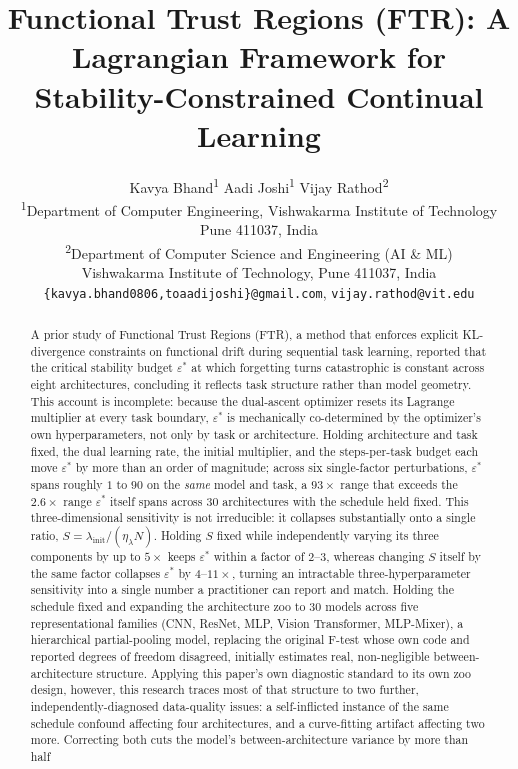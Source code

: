 \documentclass[11pt]{article}
\title{Functional Trust Regions (FTR): A Lagrangian Framework for\\
Stability-Constrained Continual Learning}
\author{
Kavya Bhand\textsuperscript{1} \quad Aadi Joshi\textsuperscript{1} \quad Vijay Rathod\textsuperscript{2} \\[4pt]
\small \textsuperscript{1}Department of Computer Engineering, Vishwakarma Institute of Technology \\
\small Pune 411037, India \\[2pt]
\small \textsuperscript{2}Department of Computer Science and Engineering (AI \& ML) \\
\small Vishwakarma Institute of Technology, Pune 411037, India \\[4pt]
\small \texttt{\{kavya.bhand0806,toaadijoshi\}@gmail.com}, \texttt{vijay.rathod@vit.edu}
}
\date{}
\newcommand{\eps}{\varepsilon}
\newcommand{\epsstar}{\eps^{*}}
\begin{document}
\maketitle
\let\svthefootnote\thefootnote
\let\thefootnote\relax{}
\let\thefootnote\svthefootnote

\begin{abstract}
A prior study of Functional Trust Regions (FTR), a method that enforces
explicit KL-divergence constraints on functional drift during sequential
task learning, reported that the critical stability budget $\epsstar$ at
which forgetting turns catastrophic is constant across eight architectures,
concluding it reflects task structure rather than model geometry. This
account is incomplete: because the dual-ascent optimizer resets its Lagrange
multiplier at every task boundary, $\epsstar$ is mechanically co-determined
by the optimizer's own hyperparameters, not only by task or architecture.
Holding architecture and task fixed, the dual learning rate, the initial
multiplier, and the steps-per-task budget each move $\epsstar$ by more than
an order of magnitude; across six single-factor perturbations, $\epsstar$
spans roughly $1$ to $90$ on the \emph{same} model and task, a $93\times$
range that exceeds the $2.6\times$ range $\epsstar$ itself spans across
30 architectures with the schedule held fixed. This
three-dimensional sensitivity is not irreducible: it collapses
substantially onto a single ratio, $S=\lambda_{\mathrm{init}}/(\eta_\lambda N)$.
Holding $S$ fixed while independently varying its three components by up
to $5\times$ keeps $\epsstar$ within a factor of $2$--$3$, whereas changing
$S$ itself by the same factor collapses $\epsstar$ by $4$--$11\times$,
turning an intractable three-hyperparameter sensitivity into a single
number a practitioner can report and match. Holding the schedule fixed and
expanding the architecture zoo to 30 models across five representational
families (CNN, ResNet, MLP, Vision Transformer, MLP-Mixer), a hierarchical
partial-pooling model, replacing the original F-test whose own code and
reported degrees of freedom disagreed, initially estimates real,
non-negligible between-architecture structure. Applying this paper's own
diagnostic standard to its own zoo design, however, this research traces
most of that structure to two further, independently-diagnosed
data-quality issues: a
self-inflicted instance of the same schedule confound affecting four
architectures, and a curve-fitting artifact affecting two more. Correcting
both cuts the model's between-architecture variance by more than half

\end{abstract}
\end{document}
